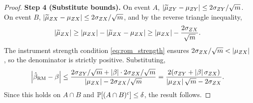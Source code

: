 \begin{proof}
\medskip\noindent\textbf{Step 4 (Substitute bounds).} On event $A$, $\left|\widetilde{\mu}_{ZY} - \mu_{ZY}\right| \leq 2\sigma_{ZY}/\sqrt{m}$. On event $B$, $\left|\widetilde{\mu}_{ZX} - \mu_{ZX}\right| \leq 2\sigma_{ZX}/\sqrt{m}$, and by the reverse triangle inequality,
\[
    \left|\widetilde{\mu}_{ZX}\right| \geq \left|\mu_{ZX}\right| - \left|\widetilde{\mu}_{ZX} - \mu_{ZX}\right| \geq \left|\mu_{ZX}\right| - \frac{2\sigma_{ZX}}{\sqrt{m}}.
\]
The instrument strength condition \eqref{eq:rom_strength} ensures $2\sigma_{ZX}/\sqrt{m} < \left|\mu_{ZX}\right|$, so the denominator is strictly positive. Substituting,
\[
    \left|\hat{\beta}_{\mathrm{RM}} - \beta\right| \leq \frac{2\sigma_{ZY}/\sqrt{m} + \left|\beta\right|\cdot 2\sigma_{ZX}/\sqrt{m}}{\left|\mu_{ZX}\right| - 2\sigma_{ZX}/\sqrt{m}} = \frac{2(\sigma_{ZY} + \left|\beta\right|\sigma_{ZX})}{\left|\mu_{ZX}\right|\sqrt{m} - 2\sigma_{ZX}}.
\]
Since this holds on $A \cap B$ and $\operatorname{\mathbb{P}}[(A \cap B)^c] \leq \delta$, the result follows.
\end{proof}